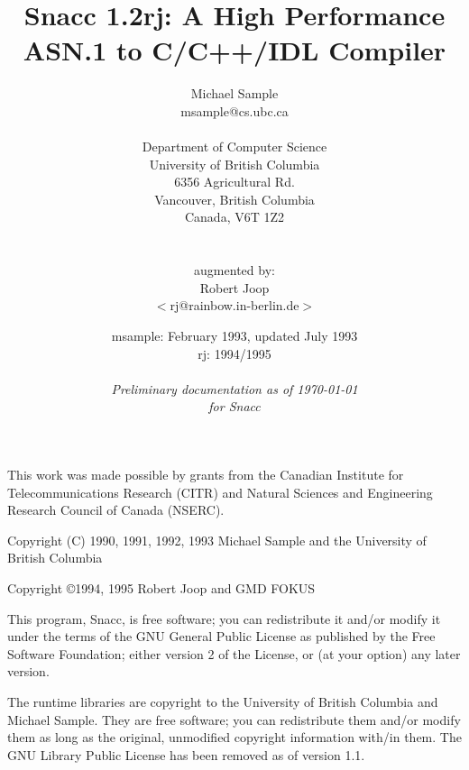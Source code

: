 \documentclass[\fmtsize,a4paper,twoside]{report}
\begin{document}
\thispagestyle{empty}
\title{Snacc 1.2rj: A High Performance ASN.1 to C/C++/IDL Compiler}
\author{Michael Sample\\
        msample@cs.ubc.ca\\\\
        Department of Computer Science\\
        University of British Columbia\\
        6356 Agricultural Rd.\\
        Vancouver, British Columbia\\
        Canada, V6T 1Z2\\\\
	\\
	augmented by:\\
	Robert Joop\\
	$<$rj@rainbow.in-berlin.de$>$}
\date{msample: February 1993, updated July 1993\\
rj: 1994/1995\\
\quad\\
\emph{Preliminary documentation as of \today\\for Snacc \snaccversion}
}
\maketitle


This work was made possible by grants from the Canadian Institute for
Telecommunications Research (CITR) and Natural Sciences and
Engineering Research Council of Canada (NSERC).

Copyright (C) 1990, 1991, 1992, 1993 Michael Sample
          and the University of British Columbia

Copyright \copyright 1994, 1995 Robert Joop
	and GMD FOKUS

This program, Snacc, is free software; you can redistribute it and/or
modify it under the terms of the GNU General Public License as
published by the Free Software Foundation; either version 2 of the
License, or (at your option) any later version.

The runtime libraries are copyright to the University of British
Columbia and Michael Sample.  They are free software; you can
redistribute them and/or modify them as long as the original,
unmodified copyright information with/in them.  The GNU Library
Public License has been removed as of version 1.1.
\end{document}
